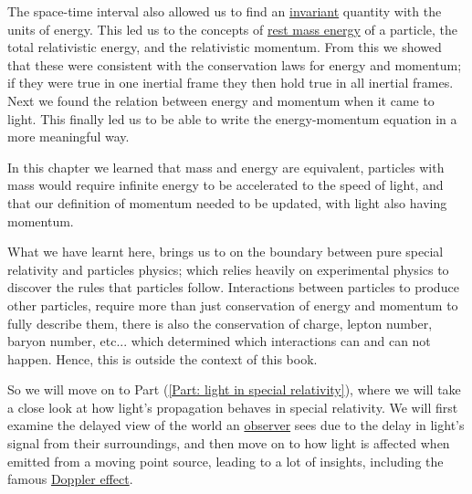 The space-time interval also allowed us to find an \hyperlink{def-lorentz-invariant}{invariant} quantity with the units of energy.
This led us to the concepts of \hyperlink{def-rest-mass-energy}{rest mass energy} of a particle, the total relativistic energy, and the relativistic momentum.
From this we showed that these were consistent with the conservation laws for energy and momentum; if they were true in one inertial frame they then hold true in all inertial frames.
Next we found the relation between energy and momentum when it came to light.
This finally led us to be able to write the energy-momentum equation in a more meaningful way.

In this chapter we learned that mass and energy are equivalent, particles with mass would require infinite energy to be accelerated to the speed of light, and that our definition of momentum needed to be updated, with light also having momentum.

What we have learnt here, brings us to on the boundary between pure special relativity and particles physics; which relies heavily on experimental physics to discover the rules that particles follow.
Interactions between particles to produce other particles, require more than just conservation of energy and momentum to fully describe them, there is also the conservation of charge, lepton number, baryon number, etc... which determined which interactions can and can not happen.
Hence, this is outside the context of this book.

So we will move on to Part (\ref{Part: light in special relativity}), where we will take a close look at how light's propagation behaves in special relativity.
We will first examine the delayed view of the world an \hyperlink{def-observer}{observer} sees due to the delay in light's signal from their surroundings, and then move on to how light is affected when emitted from a moving point source, leading to a lot of insights, including the famous \hyperlink{def-doppler-effect}{Doppler effect}.


